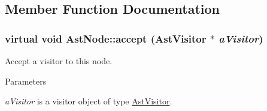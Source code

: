 \subsection{Member Function Documentation}
\hypertarget{classAstNode_a67b2d6ce1262da2954fb4db255759fb3}{
\subsubsection[{accept}]{\setlength{\rightskip}{0pt plus 5cm}virtual void AstNode::accept ({\bf AstVisitor} $\ast$ {\em aVisitor})}}
\label{classAstNode_a67b2d6ce1262da2954fb4db255759fb3}
Accept a visitor to this node. 
\begin{DoxyParams}{Parameters}
\item[{\em aVisitor}]is a visitor object of type \hyperlink{classAstVisitor}{AstVisitor}. \end{DoxyParams}


